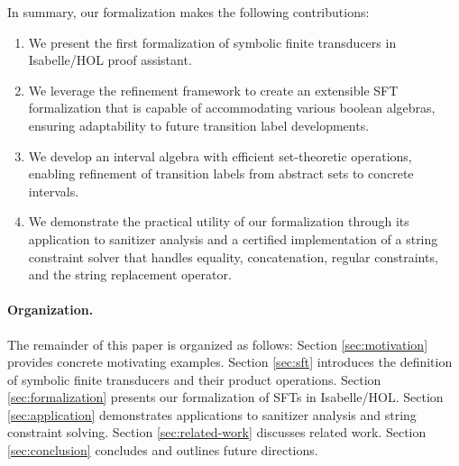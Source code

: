 


In summary, our formalization makes the following contributions:
\begin{enumerate}
\item We present the first formalization of symbolic finite transducers in Isabelle/HOL proof assistant.
\item We leverage the refinement framework to create an extensible SFT formalization that is capable of accommodating various boolean algebras, ensuring adaptability to future transition label developments.
\item We develop an interval algebra with efficient set-theoretic operations, enabling refinement of transition labels from abstract sets to concrete intervals.
\item We demonstrate the practical utility of our formalization through its
    application to sanitizer analysis and a certified implementation of
    a string constraint solver that handles equality, concatenation, regular
        constraints, and the string replacement operator.
\end{enumerate}

\paragraph{Organization.}
The remainder of this paper is organized as follows:
Section \ref{sec:motivation} provides concrete motivating examples.
Section \ref{sec:sft} introduces the definition of symbolic finite transducers and their product operations.
Section \ref{sec:formalization} presents our formalization of SFTs in Isabelle/HOL.
Section \ref{sec:application} demonstrates applications to sanitizer analysis and string constraint solving.
Section \ref{sec:related-work} discusses related work.
Section \ref{sec:conclusion} concludes and outlines future directions.
